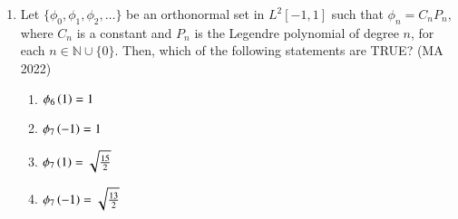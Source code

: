 \documentclass[journal,12pt,onecolumn]{IEEEtran}
\theoremstyle{remark}
\begin{document}
\begin{enumerate}
\begin{enumerate}
\end{enumerate}
\item Let $\{ \phi_0,\phi_1,\phi_2,\dots\}$ be an orthonormal set in $L^2[-1, 1]$ such that $\phi_n = C_nP_n$, where
$C_n$ is a constant and $P_n$ is the Legendre polynomial of degree $n$, for each $n \in \mathbb{N} \cup \{0\}$. Then, which of the following statements are TRUE?
\hfill{(MA 2022)}
\begin{multicols}{4}
\begin{enumerate}
\item $\phi_6\left(1\right)=1$
\item $\phi_7\left(-1\right)=1$
\item $\phi_7\left(1\right)=\sqrt{\frac{15}{2}}$
\item $\phi_7\left(-1\right)=\sqrt{\frac{13}{2}}$
\end{enumerate}
\end{multicols}
\end{enumerate}
\end{document}
